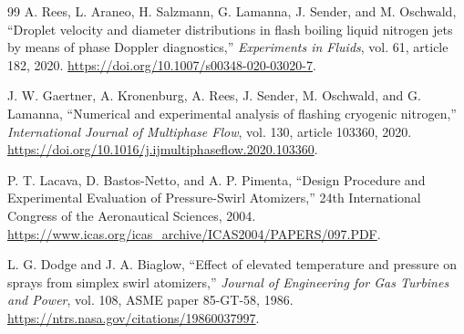 \documentclass[11pt]{article}
\begin{document}
\begin{thebibliography}{99}
A. Rees, L. Araneo, H. Salzmann, G. Lamanna, J. Sender, and M. Oschwald,
``Droplet velocity and diameter distributions in flash boiling liquid nitrogen
jets by means of phase Doppler diagnostics,''
\emph{Experiments in Fluids}, vol. 61, article 182, 2020.
\url{https://doi.org/10.1007/s00348-020-03020-7}.

J. W. Gaertner, A. Kronenburg, A. Rees, J. Sender, M. Oschwald, and G. Lamanna,
``Numerical and experimental analysis of flashing cryogenic nitrogen,''
\emph{International Journal of Multiphase Flow}, vol. 130, article 103360, 2020.
\url{https://doi.org/10.1016/j.ijmultiphaseflow.2020.103360}.

P. T. Lacava, D. Bastos-Netto, and A. P. Pimenta,
``Design Procedure and Experimental Evaluation of Pressure-Swirl Atomizers,''
24th International Congress of the Aeronautical Sciences, 2004.
\url{https://www.icas.org/icas_archive/ICAS2004/PAPERS/097.PDF}.

L. G. Dodge and J. A. Biaglow,
``Effect of elevated temperature and pressure on sprays from simplex swirl
atomizers,'' \emph{Journal of Engineering for Gas Turbines and Power},
vol. 108, ASME paper 85-GT-58, 1986.
\url{https://ntrs.nasa.gov/citations/19860037997}.

\end{thebibliography}
\end{document}
